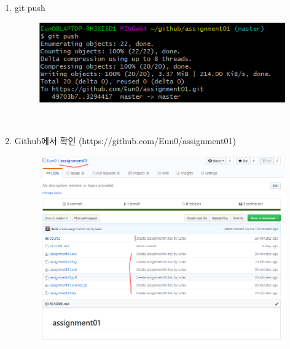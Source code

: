 \documentclass[a4paper]{article}
\begin{document}
\begin{enumerate}
		\newpage
		\item git push
		\begin{figure}[h!]
			\begin{center}
				\includegraphics[scale=0.8]{source/5}
			\end{center}
		\end{figure}\\

	
		\item Github에서 확인 (https://github.com/Eun0/assignment01)
		\begin{figure}[htbp]
			\begin{center}
				\includegraphics[scale=0.7]{source/6}
			\end{center}
		\end{figure}
		
	\end{enumerate}
	
	
	
	
	
	
	
	
	
	
	
	

	
\end{document}
